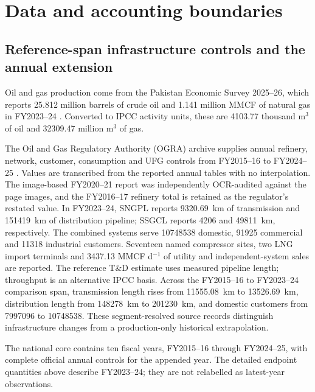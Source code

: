 \section{Data and accounting boundaries}
\label{sec:data}

\subsection{Reference-span infrastructure controls and the annual extension}

Oil and gas production come from the Pakistan Economic Survey 2025--26, which reports
\num{25.812} million barrels of crude oil and \num{1.141} million MMCF of natural gas in
FY2023--24 \citep{peseconomic2026}. Converted to IPCC activity units, these are
\num{4103.77} thousand m$^3$ of oil and
\num{32309.47} million m$^3$ of gas.

The Oil and Gas Regulatory Authority (OGRA) archive supplies annual refinery, network, customer,
consumption and UFG controls from FY2015--16 to FY2024--25
\citep{ograarchive,ogra2022,ogra2023,ogra2024}. Values are transcribed from the reported annual tables with
no interpolation. The image-based FY2020--21 report was independently OCR-audited against the
page images, and the FY2016--17 refinery total is retained as the regulator's restated value.
In FY2023--24, SNGPL reports
\SI{9320.69}{\kilo\metre} of transmission and
\SI{151419}{\kilo\metre} of distribution pipeline; SSGCL reports \SI{4206}{} and
\SI{49811}{\kilo\metre}, respectively. The combined systems serve \num{10748538} domestic,
\num{91925} commercial and \num{11318} industrial customers. Seventeen named compressor sites,
two LNG import terminals and \num{3437.13} MMCF d$^{-1}$ of utility and independent-system sales are
reported. The reference T\&D estimate uses measured pipeline length; throughput is an alternative
IPCC basis. Across the FY2015--16 to FY2023--24 comparison span, transmission length rises from
\SI{11555.08}{\kilo\metre} to \SI{13526.69}{\kilo\metre}, distribution length from
\SI{148278}{\kilo\metre} to \SI{201230}{\kilo\metre}, and domestic customers from \num{7997096} to
\num{10748538}. These segment-resolved source records distinguish infrastructure changes from a
production-only historical extrapolation.

The national core contains ten fiscal years, FY2015--16 through FY2024--25, with complete official annual controls for the appended year. The detailed endpoint quantities above describe FY2023--24; they are not relabelled as latest-year observations.


